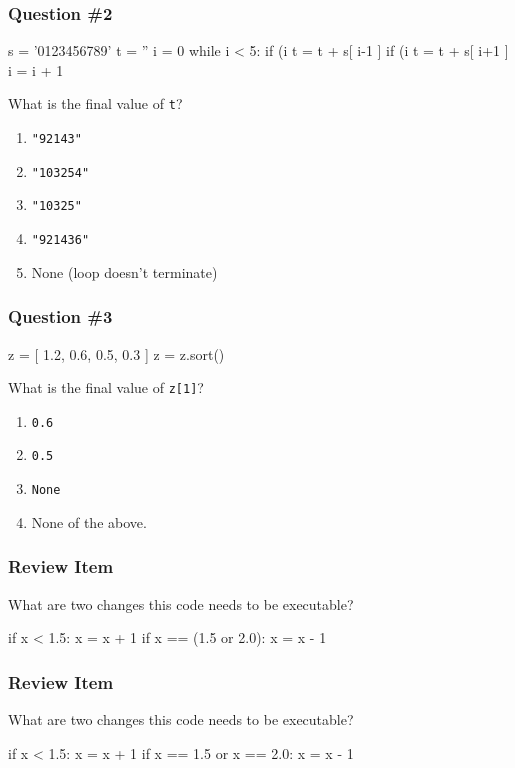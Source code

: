\documentclass[11pt]{beamer}
\begin{document}
\begin{frame}[fragile]
  \frametitle{Question \#2}
  \Enlarge

  \begin{semiverbatim}
s = '0123456789'
t = ''
i = 0
while i < 5:
    if (i%
        t = t + s[ i-1 ]
    if (i%
        t = t + s[ i+1 ]
    i = i + 1
\end{semiverbatim}
  What is the final value of \texttt{t}?
  \begin{enumerate}[label=\Alph*]
  \item  \texttt{"92143"}
  \item  \texttt{"103254"}
  \item  \texttt{"10325"} %
  \item  \texttt{"921436"}
  \item  None (loop doesn't terminate)
  \end{enumerate}
\end{frame}

\begin{frame}[fragile]
  \frametitle{Question \#3}
  \Enlarge

  \begin{semiverbatim}
z = [ 1.2, 0.6, 0.5, 0.3 ]
z = z.sort()
  \end{semiverbatim}
  What is the final value of \texttt{z[1]}?
  \begin{enumerate}[label=\Alph*]
  \item  \texttt{0.6}
  \item  \texttt{0.5}
  \item  \texttt{None} %
  \item  None of the above.
  \end{enumerate}
\end{frame}

\begin{frame}[fragile]
  \frametitle{Review Item}
  \Enlarge

  What are two changes this code needs to be executable?
  \begin{semiverbatim}
if x < 1.5:
    x = x + 1
 if x == (1.5 or 2.0):
     x = x - 1
  \end{semiverbatim}
\end{frame}

\begin{frame}[fragile]
  \frametitle{Review Item}
  \Enlarge

  What are two changes this code needs to be executable?
  \begin{semiverbatim}
if x < 1.5:
    x = x + 1
if x == 1.5 or x == 2.0:
    x = x - 1
  \end{semiverbatim}
\end{frame}
\end{document}
